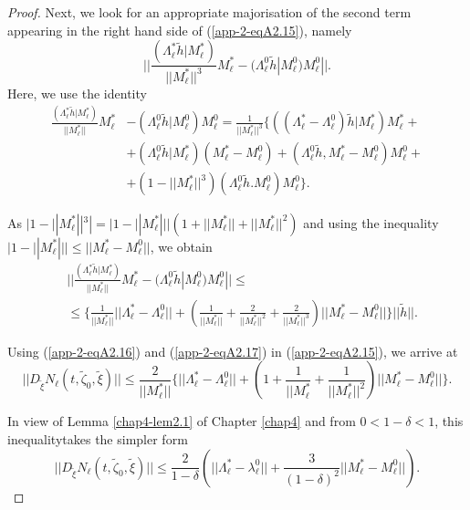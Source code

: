 \begin{proof}
Next, we look for an appropriate majorisation of the second term
appearing in the right hand side of (\ref{app-2-eqA2.15}), namely 
$$||\frac{(\Lambda_{\ell}^{*} \widetilde{h} |
  M_{\ell}^{*})}{||M_{\ell}^{*}||^{3}} M_{\ell}^{*} -
(\Lambda_{\ell}^{0} \widetilde{h} | M_{\ell}^{0})
M_{\ell}^{0}||.$$ Here, we use the identity
\begin{align*}
\frac{(\Lambda_{\ell}^{*} \widetilde{h} |
  M_{\ell}^{*})}{||M_{\ell}^{*}||} M_{\ell}^{*} & - (\Lambda_{\ell}^{0}
\widetilde{h} | M_{\ell}^{0}) M_{\ell}^{0} =
\frac{1}{||M_{\ell}^{*}||^{3}} \{((\Lambda_{\ell}^{*} -
\Lambda_{\ell}^{0}) \widetilde{h} | M_{\ell}^{*}) M_{\ell}^{*} +\\
 & + (\Lambda_{\ell}^{0}  \widetilde{h} | M_{\ell}^{*}) (M_{\ell}^{*}
- M_{\ell}^{0}) + (\Lambda_{\ell}^{0}  \widetilde{h}, M_{\ell}^{*} -
M_{\ell}^{0}) M_{\ell}^{0} + \\
& + (1 - ||M_{\ell}^{*}||^{3}) (\Lambda_{\ell}^{0}
\widetilde{h}. M_{\ell}^{0})M_{\ell}^{0}\}. 
\end{align*}

As $|1 - ||M_{\ell}^{*}||^{3}| = |1 - ||M_{\ell}^{*}|| | (1 +
||M_{\ell}^{*}|| + ||M_{\ell}^{*}||^{2})$ and using the inequality $|1
- ||M_{\ell}^{*}|| | \leq ||M_{\ell}^{*} - M_{\ell}^{0}||$, we obtain
\begin{align*}
& || \frac{(\Lambda_{\ell}^{*}  \widetilde{h} |
    M_{\ell}^{*})}{||M_{\ell}^{*}||} M_{\ell}^{*} -
  (\Lambda_{\ell}^{0}  \widetilde{h} | M_{\ell}^{0}) M_{\ell}^{0}||
  \leq \tag{A2.17}\label{app-2-eqA2.17} \\
& \leq \{\frac{1}{||M_{\ell}^{*}||} ||\Lambda_{\ell}^{*} -
  \Lambda_{\ell}^{0}|| + \left(\frac{1}{||M_{\ell}^{*}||} +
  \frac{2}{||M_{\ell}^{*}||^{2}} +
  \frac{2}{||M_{\ell}^{*}||^{3}}\right) ||M_{\ell}^{*} -
  M_{\ell}^{0}||\} || \widetilde{h}||.
\end{align*}

Using (\ref{app-2-eqA2.16}) and (\ref{app-2-eqA2.17}) in (\ref{app-2-eqA2.15}), we arrive at
$$
||D_{\widetilde{\xi}}N_{\ell}(t,  \widetilde{\zeta}_{0},
\widetilde{\xi})|| \leq \frac{2}{||M_{\ell}^{*}||}
\{||\Lambda_{\ell}^{*} - \Lambda_{\ell}^{0}|| + \left(1 +
\frac{1}{||M_{\ell}^{*}} + \frac{1}{||M_{\ell}^{*}||^{2}}\right)
||M_{\ell}^{*} - M_{\ell}^{0}||\}.
$$

In view of Lemma \ref{chap4-lem2.1} of Chapter \ref{chap4} and from
$0 < 1 - \delta < 1$, this inequality\pageoriginale takes the simpler
form
\begin{equation*}
||D_{ \widetilde{\xi}}N_{\ell} (t,  \widetilde{\zeta}_{0},
\widetilde{\xi})|| \leq \frac{2}{1 - \delta}
\left(||\Lambda_{\ell}^{*} - \lambda_{\ell}^{0}|| +
\frac{3}{(1-\delta)^{2}} ||M_{\ell}^{*} - M_{\ell}^{0}||\right).\tag{A2.18}\label{app-2-eqA2.18}
\end{equation*}


\end{proof}
